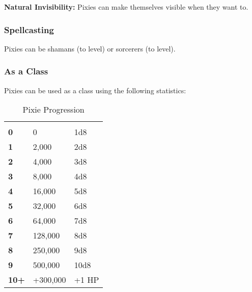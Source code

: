 \begin{multicols*}{2}
\textbf{Natural Invisibility:} Pixies can make themselves visible when they want to.

\subsubsection{Spellcasting}
Pixies can be shamans (to  level) or sorcerers (to  level).

\subsubsection{As a Class}
Pixies can be used as a class using the following statistics:


\begin {table}[H]
  \caption{Pixie Progression}
  \begin{tabularx}{\columnwidth}{>{\bfseries}YYY}
   &  & \\
	0 & 0 & 1d8\\
	1 & 2,000 & 2d8\\
	2 & 4,000 & 3d8\\
	3 & 8,000 & 4d8\\
	4 & 16,000 & 5d8\\
	5 & 32,000 & 6d8\\
	6 & 64,000 & 7d8\\
	7 & 128,000 & 8d8\\
	8 & 250,000 & 9d8\\
	9 & 500,000 & 10d8\\
	10+ & +300,000 & +1 HP
  \end {tabularx}
\end {table}


\end{multicols*}
